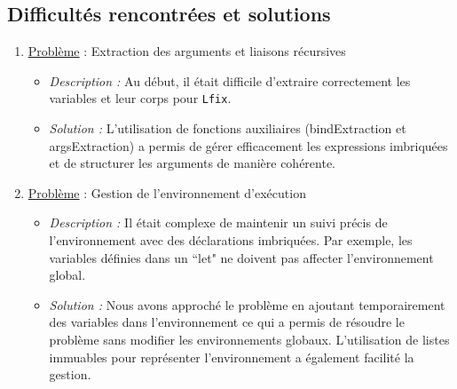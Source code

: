 \documentclass{article}
\begin{document}
\subsection{Difficultés rencontrées et solutions}
\begin{enumerate}
    \item \underline{Problème} : Extraction des arguments et liaisons récursives 
        \begin{itemize}
            \item \textit{Description :} Au début, il était difficile d’extraire correctement les variables et 
                                         leur corps pour \texttt{Lfix}.
            \item \textit{Solution :} L’utilisation de fonctions auxiliaires (bindExtraction et argsExtraction) 
                                      a permis de gérer efficacement les expressions imbriquées et de structurer 
                                      les arguments de manière cohérente.
        \end{itemize}
        
    \item \underline{Problème} : Gestion de l'environnement d’exécution
        \begin{itemize}
            \item \textit{Description :} Il était complexe de maintenir un suivi précis de l’environnement avec 
                                         des déclarations imbriquées. Par exemple, les variables définies dans un 
                                         ``let" ne doivent pas affecter l’environnement global.
            \item \textit{Solution :} Nous avons approché le problème en ajoutant temporairement des variables dans 
                                      l’environnement ce qui a permis de résoudre le problème sans modifier les 
                                      environnements globaux. L’utilisation de listes immuables pour représenter 
                                      l'environnement a également facilité la gestion.
        \end{itemize}


\end{enumerate}
\end{document}
